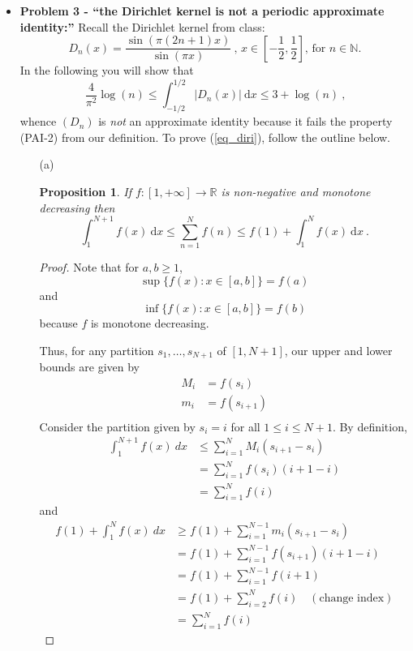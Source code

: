 \documentclass[12pt, reqno]{amsart}
\newtheorem{prop}{Proposition}[section]
\theoremstyle{definition}
\theoremstyle{remark}
\newcommand{\ud}{\mathrm{d}}
\begin{document}
\begin{itemize}
\begin{itemize}
\end{itemize}

\vspace{0.2 cm}
\item {\bf{Problem 3 - ``the Dirichlet kernel is not a periodic approximate identity:''}} Recall the Dirichlet kernel from class: 
\begin{equation*}
D_n(x) = \dfrac{\sin(\pi (2 n + 1)x)}{\sin(\pi x)} ~\mbox{, $x \in [-\frac{1}{2}, \frac{1}{2}]$, for $n \in \mathbb{N}$.}
\end{equation*}
In the following you will show that 
\begin{equation} \label{eq_diri}
\frac{4}{\pi^2} \log(n) \leq \int_{-1/2}^{1/2} \vert D_n(x) \vert ~\ud x \leq 3 + \log(n) ~\mbox{,}
\end{equation}
whence $(D_n)$ is {\em{not}} an approximate identity because it fails the property (PAI-2) from our definition. To prove (\ref{eq_diri}), follow the outline below.

\vspace{0.1 cm}
\begin{itemize}
\item[(a)]
\begin{prop}
If $f: [1, +\infty] \to \mathbb{R}$ is non-negative and monotone decreasing then
\begin{equation*}
\int_1^{N+1} f(x) ~\ud x \leq \sum_{n=1}^{N} f(n) \leq f(1) + \int_1^N f(x) ~\ud x ~\mbox{.}
\end{equation*}
\end{prop}

\begin{proof}
   Note that for $a,b\ge 1$, $$\sup\{f(x):x\in[a,b]\}=f(a)$$and $$\inf\{f(x):x\in [a,b]\}=f(b)$$because $f$ is monotone decreasing.

Thus, for any partition $s_{1},\ldots,s_{N+1}$ of $[1,N+1]$, our upper and lower bounds are given by \begin{align*}
M_{i}&= f(s_{i})\\
m_{i}&= f(s_{i+1})\\
\end{align*}Consider the partition given by $s_{i}=i$ for all $1\le i\le N+1$. By definition, \begin{align*}
\int_{1}^{N+1}f(x)\ dx&\le \sum_{i=1}^{N}M_{i}(s_{i+1}-s_{i})\\
&= \sum_{i=1}^{N}f(s_{i})(i+1-i)\\
&= \sum_{i=1}^{N}f(i)
\end{align*}and \begin{align*}
f(1)+\int_{1}^{N}f(x)\ dx&\ge f(1)+\sum_{i=1}^{N-1}m_{i}(s_{i+1}-s_{i})\\
&= f(1)+\sum_{i=1}^{N-1}f(s_{i+1})(i+1-i)\\
&= f(1)+\sum_{i=1}^{N-1}f(i+1)\\
&= f(1)+\sum_{i=2}^{N}f(i)\quad(\text{change index})\\
&= \sum_{i=1}^{N}f(i)
\end{align*}
\end{proof}


\end{itemize}
\end{itemize}
\end{document}
